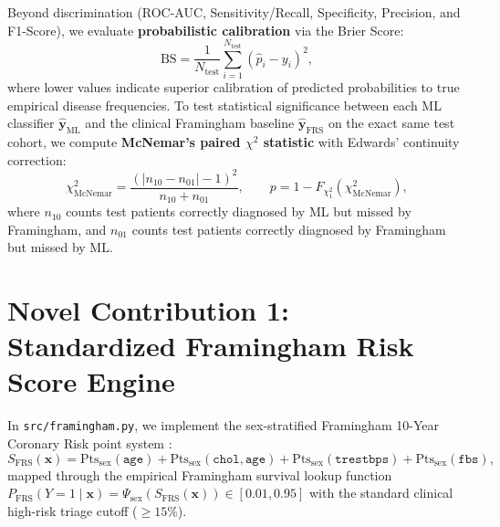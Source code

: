 \documentclass[12pt,a4paper]{report}
\begin{document}
Beyond discrimination (ROC-AUC, Sensitivity/Recall, Specificity, Precision, and F1-Score), we evaluate \textbf{probabilistic calibration} via the Brier Score:
\begin{equation}
    \text{BS} = \frac{1}{N_{\text{test}}} \sum_{i=1}^{N_{\text{test}}} \left(\hat{p}_i - y_i\right)^2,
\end{equation}
where lower values indicate superior calibration of predicted probabilities to true empirical disease frequencies. To test statistical significance between each ML classifier $\hat{\bm{y}}_{\text{ML}}$ and the clinical Framingham baseline $\hat{\bm{y}}_{\text{FRS}}$ on the exact same test cohort, we compute \textbf{McNemar's paired $\chi^2$ statistic} with Edwards' continuity correction:
\begin{equation}
    \chi^2_{\text{McNemar}} = \frac{\left(|n_{10} - n_{01}| - 1\right)^2}{n_{10} + n_{01}}, \qquad p = 1 - F_{\chi^2_1}\left(\chi^2_{\text{McNemar}}\right),
\end{equation}
where $n_{10}$ counts test patients correctly diagnosed by ML but missed by Framingham, and $n_{01}$ counts test patients correctly diagnosed by Framingham but missed by ML.

\section{Novel Contribution 1: Standardized Framingham Risk Score Engine}
In \texttt{src/framingham.py}, we implement the sex-stratified Framingham 10-Year Coronary Risk point system \cite{wilson1998prediction,dagostino2008general}:
\begin{equation}
    S_{\text{FRS}}(\bm{x}) = \text{Pts}_{\text{sex}}(\texttt{age}) + \text{Pts}_{\text{sex}}(\texttt{chol}, \texttt{age}) + \text{Pts}_{\text{sex}}(\texttt{trestbps}) + \text{Pts}_{\text{sex}}(\texttt{fbs}),
\end{equation}
mapped through the empirical Framingham survival lookup function $P_{\text{FRS}}(Y=1 \mid \bm{x}) = \Psi_{\text{sex}}(S_{\text{FRS}}(\bm{x})) \in [0.01, 0.95]$ with the standard clinical high-risk triage cutoff ($\ge 15\%$).
\end{document}
